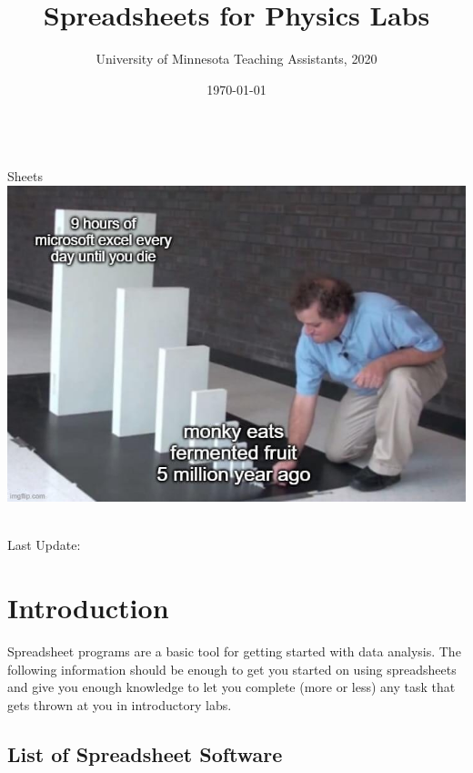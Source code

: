 \documentclass[10pt]{article}
\title{Spreadsheets for Physics Labs}
\author{University of Minnesota Teaching Assistants, 2020}
\date{\today}
\makeatletter
\def\Subtitle{Sheets}
\let\Date\@date
\let\Author\@author
\let\Title\@title
\makeatother
\begin{document}
\begin{center}
    \thispagestyle{empty}
    \vspace*{3cm}
    {\bfseries\Huge \Title}\\
    \vspace{0.5cm}
    {\huge \Subtitle}\\

	\vspace{1cm}
		\centering
		\includegraphics[width=0.8\linewidth]{images/excel.jpg}

    \vspace{2cm}
    {\Author}\\\vspace{1cm}
    {Last Update: \Date}
\end{center}
\newpage
\tableofcontents
\newpage

\newenvironment{sheetpic}{\begin{center}\begin{tikzpicture}}{\end{tikzpicture}\end{center}}

\def\annotateIm#1#2#3#4#5#6{\path #1 ++ (#2:#3) node[#5] (temp) {#4};\draw[-latex,#6] (temp) -- #1;}

\section{Introduction}%
\label{sec:introduction}

Spreadsheet programs are a basic tool for getting started with data analysis. 
The following information should be enough to get you started on using spreadsheets and give you enough knowledge to let  you complete (more or less) any task that gets thrown at you in introductory labs. 


\subsection{List of Spreadsheet Software}%
\label{sub:listof}
\end{document}

